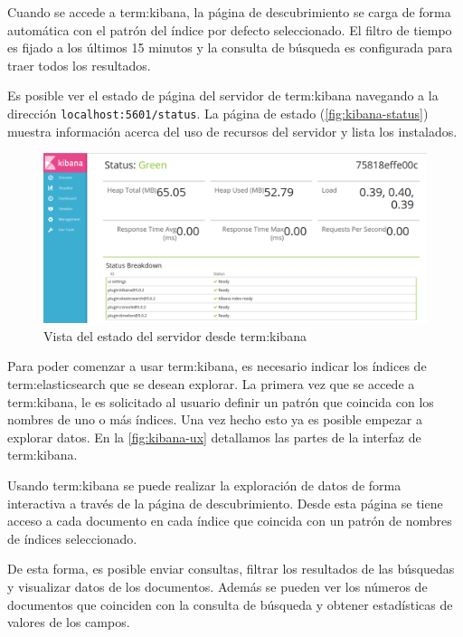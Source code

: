 Cuando se accede a \gls{term:kibana}, la página de descubrimiento se carga de
forma automática con el patrón del índice por defecto seleccionado. El filtro
de tiempo es fijado a los últimos 15 minutos y la consulta de búsqueda es
configurada para traer todos los resultados.

Es posible ver el estado de página del servidor de \gls{term:kibana}
navegando a la dirección \lstinline{localhost:5601/status}. La página de estado
(\autoref{fig:kibana-status}) muestra información acerca del uso de recursos
del servidor y lista los  instalados.

\begin{figure}
  \includegraphics[width=\linewidth]{src/images/05-capitulo-5/kibanastatus.jpg}
  \caption{Vista del estado del servidor desde \gls{term:kibana}}
  \label{fig:kibana-status}
\end{figure}

Para poder comenzar a usar \gls{term:kibana}, es necesario indicar los índices
de \gls{term:elasticsearch} que se desean explorar. La primera vez que se accede
a \gls{term:kibana}, le es solicitado al usuario definir un patrón que coincida
con los nombres de uno o más índices. Una vez hecho esto ya es posible empezar a
explorar datos. En la \autoref{fig:kibana-ux} detallamos las partes de la
interfaz de \gls{term:kibana}.

Usando \gls{term:kibana} se puede realizar la exploración de datos de forma
interactiva a través de la página de descubrimiento. Desde esta página se tiene
acceso a cada documento en cada índice que coincida con un patrón de nombres de
índices seleccionado.

De esta forma, es posible enviar consultas, filtrar los resultados
de las búsquedas y visualizar datos de los documentos. Además se pueden ver los
números de documentos que coinciden con la consulta de búsqueda y obtener
estadísticas de valores de los campos.

